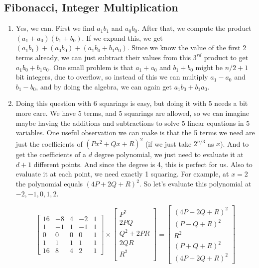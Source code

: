 \documentclass[12pt]{report}
\begin{document}
\subsection*{\Large\bfseries Fibonacci, Integer Multiplication}
\begin{enumerate}[label=\textbf{\arabic*.}]

    \item Yes, we can. First we find $a_1 b_1$ and $a_0 b_0$. After that, we compute the product $(a_1 + a_0)(b_1 + b_0)$. If we 
    expand this, we get $(a_1 b_1) + (a_0 b_0) + (a_1 b_0 + b_1 a_0)$. Since we know the value of the first 2 terms already, we
    can just subtract their values from this $3^{rd}$ product to get $a_1 b_0 + b_1 a_0$. One small problem is that $a_1+a_0$ and
    $b_1+b_0$ might be $n/2 + 1$ bit integers, due to overflow, so instead of this we can multiply $a_1-a_0$ and $b_1-b_0$, and 
    by doing the algebra, we can again get $a_1 b_0 + b_1 a_0$.

    \item Doing this question with 6 squarings is easy, but doing it with 5 needs a bit more care. We have 5 terms, and 5 squarings
    are allowed, so we can imagine maybe having the additions and subtractions to solve 5 linear equations in 5 variables. One useful
    observation we can make is that the 5 terms we need are just the coefficients of ${(Px^2 + Qx + R)}^2$ (if we just take $2^{n/3}$
    as $x$). And to get the coefficients of a $d$ degree polynomial, we just need to evaluate it at $d+1$ different points. And since
    the degree is 4, this is perfect for us. Also to evaluate it at each point, we need exactly 1 squaring. For example, at $x = 2$ the 
    polynomial equals ${(4P + 2Q + R)}^2$. So let's evaluate this polynomial at $-2, -1, 0, 1, 2$.

    \begin{equation*}
        \begin{bmatrix}
            16 & -8 & 4 & -2 & 1 \\
            1 & -1 & 1 & -1 & 1 \\
            0 & 0 & 0 & 0 & 1 \\
            1 & 1 & 1 & 1 & 1 \\
            16 & 8 & 4 & 2 & 1 
        \end{bmatrix}
        \times
        \begin{bmatrix}
            P^2 \\
            2PQ \\
            Q^2 + 2PR \\
            2QR \\
            R^2 \\
        \end{bmatrix}
        =
        \begin{bmatrix}
            {(4P - 2Q + R)}^2 \\
            {(P - Q + R)}^2 \\
            R^2 \\
            {(P + Q + R)}^2 \\
            {(4P +2Q + R)}^2
        \end{bmatrix}
    \end{equation*}


\end{enumerate}
\end{document}
